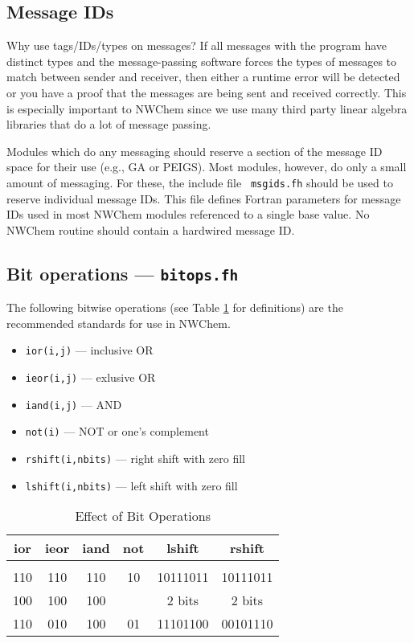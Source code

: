 \subsection{Message IDs}

Why use tags/IDs/types on messages?  If all messages with the program
have distinct types and the message-passing software forces the types
of messages to match between sender and receiver, then either a
runtime error will be detected or you have a proof that the messages
are being sent and received correctly.  This is especially important
to NWChem since we use many third party linear algebra libraries that
do a lot of message passing.

Modules which do any messaging should reserve a section of the message
ID space for their use (e.g., GA or PEIGS).  Most modules, however, do
only a small amount of messaging.  For these, the include file {\tt
  msgids.fh} should be used to reserve individual message IDs.  This
file defines Fortran parameters for message IDs used in most NWChem
modules referenced to a single base value.  No NWChem routine should
contain a hardwired message ID.


\subsection{Bit operations --- {\tt bitops.fh}}

The following bitwise operations (see Table
\ref{tabbit} for definitions) are the recommended standards for use in
NWChem.
\begin{itemize}
\item \verb+ior(i,j)+ --- inclusive OR
\item \verb+ieor(i,j)+ --- exlusive OR
\item \verb+iand(i,j)+ --- AND
\item \verb+not(i)+ --- NOT or one's complement
\item \verb+rshift(i,nbits)+ --- right shift with zero fill
\item \verb+lshift(i,nbits)+ --- left shift with zero fill
\end{itemize}
\begin{table}[h]
\begin{center}

\begin{tabular}{c|c|c|c|c|c}
 ior   &   ieor   &    iand  &   not  & lshift   & rshift   \\ \hline
       &          &          &        &          &          \\
 110   &   110    &    110   &   10   & 10111011 & 10111011 \\
 100   &   100    &    100   &        & 2 bits   & 2 bits   \\ \hline
 110   &   010    &    100   &   01   & 11101100 & 00101110 
\end{tabular}
\vspace{0.2in}
\caption{\label{tabbit} Effect of Bit Operations}


\end{center}
\end{table}

